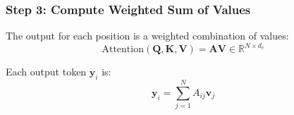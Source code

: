 \subsubsection{Step 3: Compute Weighted Sum of Values}

The output for each position is a weighted combination of values:
\begin{equation}
\text{Attention}(\mathbf{Q}, \mathbf{K}, \mathbf{V}) = \mathbf{A} \mathbf{V} \in \mathbb{R}^{N \times d_v}
\label{eq:attention_output}
\end{equation}

Each output token $\mathbf{y}_i$ is:
\begin{equation}
\mathbf{y}_i = \sum_{j=1}^{N} A_{ij} \mathbf{v}_j
\label{eq:attention_output_token}
\end{equation}

